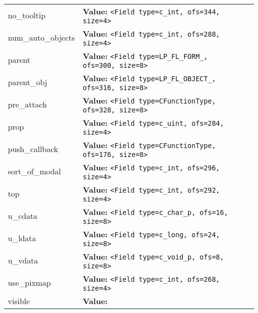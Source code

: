 \begin{longtable}{|p{\varnamewidth}|p{\vardescrwidth}|l}
\cline{1-2}
\raggedright n\-o\-\_\-t\-o\-o\-l\-t\-i\-p\- & \raggedright \textbf{Value:} 
{\tt {\textless}Field type=c\_int, ofs=344, size=4{\textgreater}}&\\
\cline{1-2}
\raggedright n\-u\-m\-\_\-a\-u\-t\-o\-\_\-o\-b\-j\-e\-c\-t\-s\- & \raggedright \textbf{Value:} 
{\tt {\textless}Field type=c\_int, ofs=288, size=4{\textgreater}}&\\
\cline{1-2}
\raggedright p\-a\-r\-e\-n\-t\- & \raggedright \textbf{Value:} 
{\tt {\textless}Field type=LP\_FL\_FORM\_, ofs=300, size=8{\textgreater}}&\\
\cline{1-2}
\raggedright p\-a\-r\-e\-n\-t\-\_\-o\-b\-j\- & \raggedright \textbf{Value:} 
{\tt {\textless}Field type=LP\_FL\_OBJECT\_, ofs=316, size=8{\textgreater}}&\\
\cline{1-2}
\raggedright p\-r\-e\-\_\-a\-t\-t\-a\-c\-h\- & \raggedright \textbf{Value:} 
{\tt {\textless}Field type=CFunctionType, ofs=328, size=8{\textgreater}}&\\
\cline{1-2}
\raggedright p\-r\-o\-p\- & \raggedright \textbf{Value:} 
{\tt {\textless}Field type=c\_uint, ofs=284, size=4{\textgreater}}&\\
\cline{1-2}
\raggedright p\-u\-s\-h\-\_\-c\-a\-l\-l\-b\-a\-c\-k\- & \raggedright \textbf{Value:} 
{\tt {\textless}Field type=CFunctionType, ofs=176, size=8{\textgreater}}&\\
\cline{1-2}
\raggedright s\-o\-r\-t\-\_\-o\-f\-\_\-m\-o\-d\-a\-l\- & \raggedright \textbf{Value:} 
{\tt {\textless}Field type=c\_int, ofs=296, size=4{\textgreater}}&\\
\cline{1-2}
\raggedright t\-o\-p\- & \raggedright \textbf{Value:} 
{\tt {\textless}Field type=c\_int, ofs=292, size=4{\textgreater}}&\\
\cline{1-2}
\raggedright u\-\_\-c\-d\-a\-t\-a\- & \raggedright \textbf{Value:} 
{\tt {\textless}Field type=c\_char\_p, ofs=16, size=8{\textgreater}}&\\
\cline{1-2}
\raggedright u\-\_\-l\-d\-a\-t\-a\- & \raggedright \textbf{Value:} 
{\tt {\textless}Field type=c\_long, ofs=24, size=8{\textgreater}}&\\
\cline{1-2}
\raggedright u\-\_\-v\-d\-a\-t\-a\- & \raggedright \textbf{Value:} 
{\tt {\textless}Field type=c\_void\_p, ofs=8, size=8{\textgreater}}&\\
\cline{1-2}
\raggedright u\-s\-e\-\_\-p\-i\-x\-m\-a\-p\- & \raggedright \textbf{Value:} 
{\tt {\textless}Field type=c\_int, ofs=268, size=4{\textgreater}}&\\
\cline{1-2}
\raggedright v\-i\-s\-i\-b\-l\-e\- & \raggedright \textbf{Value:} 

\end{longtable}
